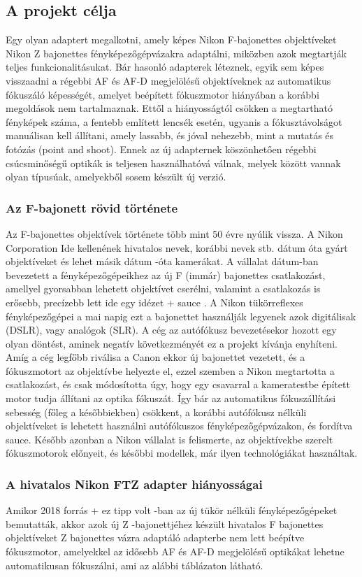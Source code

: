 \subsection{A projekt célja}
Egy olyan adaptert megalkotni, amely képes Nikon F-bajonettes objektíveket Nikon Z bajonettes fényképezőgépvázakra adaptálni, miközben azok megtartják teljes funkcionalitásukat. Bár hasonló adapterek léteznek, egyik sem képes visszaadni a régebbi AF és AF-D megjelölésű objektíveknek az automatikus fókuszáló képességét, amelyet beépített fókuszmotor hiányában a korábbi megoldások nem tartalmaznak. Ettől a hiányosságtól csökken a megtartható fényképek száma, a fentebb említett lencsék esetén, ugyanis a fókusztávolságot manuálisan kell állítani, amely lassabb, és jóval nehezebb, mint a mutatás és fotózás (point and shoot). Ennek az új adapternek köszönhetően régebbi csúcsminőségű optikák is teljesen használhatóvá válnak, melyek között vannak olyan típusúak, amelyekből sosem készült új verzió.
\subsubsection{Az F-bajonett rövid története}
Az F-bajonettes objektívek története több mint 50 évre nyúlik vissza. A Nikon Corporation {Ide kellenének hivatalos nevek, korábbi nevek  stb.} {dátum} óta gyárt objektíveket és {lehet másik dátum} {-óta } kamerákat. A vállalat {dátum}-ban bevezetett a fényképezőgépeikhez az új F (immár) bajonettes csatlakozást, amellyel gyorsabban lehetett objektívet cserélni, valamint a csatlakozás is erősebb, precízebb lett {ide egy idézet + sauce }. A Nikon tükörreflexes fényképezőgépei a mai napig ezt a bajonettet használják legyenek azok digitálisak (DSLR), vagy analógok (SLR). A cég az autófókusz bevezetésekor hozott egy olyan döntést, aminek negatív következményét ez a projekt kívánja enyhíteni. Amíg a cég legfőbb riválisa a Canon ekkor új bajonettet vezetett, és a fókuszmotort az objektívbe helyezte el, ezzel szemben a Nikon megtartotta a csatlakozást, és csak módosította úgy, hogy egy csavarral a kameratestbe épített motor tudja állítani az optika fókuszát. Így bár az automatikus fókuszállítási sebesség (főleg a későbbiekben) csökkent, a korábbi autófókusz nélküli objektíveket is lehetett használni autófókuszos fényképezőgépvázakon, és fordítva {sauce}. Később azonban a Nikon vállalat is felismerte, az objektívekbe szerelt fókuszmotorok előnyeit, és későbbi modellek, már ilyen technológiákat használtak.
\subsubsection{A hivatalos Nikon FTZ adapter hiányosságai}
Amikor 2018 {forrás + ez tipp volt} -ban az új tükör nélküli fényképezőgépeket bemutatták, akkor azok új Z -bajonettjéhez készült hivatalos F bajonettes objektíveket Z bajonettes vázra adaptáló adapterbe nem lett beépítve fókuszmotor, amelyekkel az idősebb AF és AF-D megjelölésű optikákat lehetne automatikusan fókuszálni, ami az alábbi táblázaton látható.



